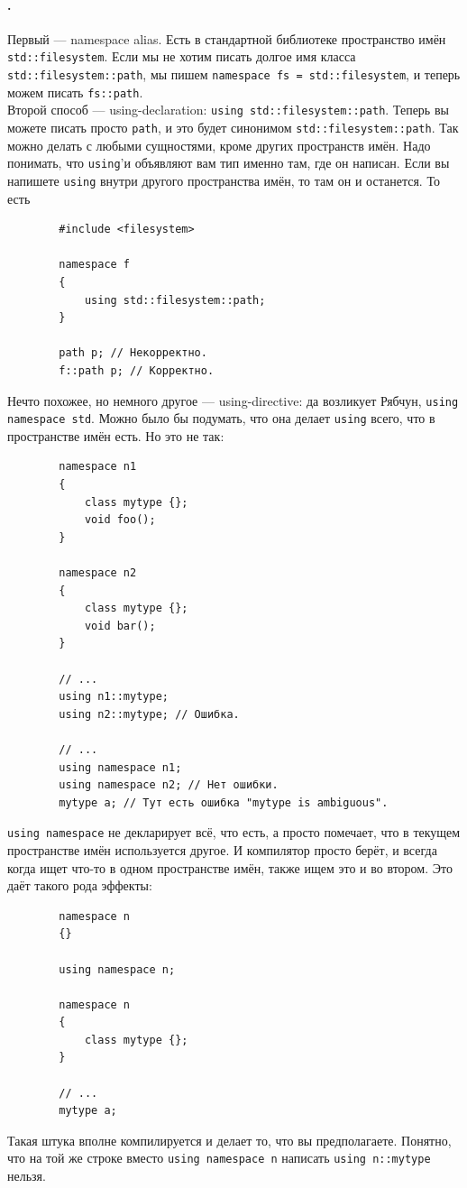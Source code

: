 \documentclass{article}
\begin{document}
    \paragraph{.}
    Первый --- namespace alias. Есть в стандартной библиотеке пространство имён \texttt{std::filesystem}. Если мы не хотим писать долгое имя класса\\\texttt{std::filesystem::path}, мы пишем \texttt{namespace fs = std::filesystem}, и теперь можем писать \texttt{fs::path}.\\
    Второй способ --- using-declaration: \texttt{using std::filesystem::path}. Теперь вы можете писать просто \texttt{path}, и это будет синонимом \texttt{std::filesystem::path}. Так можно делать с любыми сущностями, кроме других пространств имён. Надо понимать, что \texttt{using}'и объявляют вам тип именно там, где он написан. Если вы напишете \texttt{using} внутри другого пространства имён, то там он и останется. То есть
    \begin{verbatim}
        #include <filesystem>

        namespace f
        {
            using std::filesystem::path;
        }

        path p; // Некорректно.
        f::path p; // Корректно.
    \end{verbatim}
    Нечто похожее, но немного другое --- using-directive: да возликует Рябчун, \texttt{using namespace std}. Можно было бы подумать, что она делает \texttt{using} всего, что в пространстве имён есть. Но это не так:
    \begin{verbatim}
        namespace n1
        {
            class mytype {};
            void foo();
        }

        namespace n2
        {
            class mytype {};
            void bar();
        }

        // ...
        using n1::mytype;
        using n2::mytype; // Ошибка.

        // ...
        using namespace n1;
        using namespace n2; // Нет ошибки.
        mytype a; // Тут есть ошибка "mytype is ambiguous".
    \end{verbatim}
    \texttt{using namespace} не декларирует всё, что есть, а просто помечает, что в текущем пространстве имён используется другое. И компилятор просто берёт, и всегда когда ищет что-то в одном пространстве имён, также ищем это и во втором. Это даёт такого рода эффекты:
    \begin{verbatim}
        namespace n
        {}

        using namespace n;

        namespace n
        {
            class mytype {};
        }

        // ...
        mytype a;
    \end{verbatim}
    Такая штука вполне компилируется и делает то, что вы предполагаете. Понятно, что на той же строке вместо \texttt{using namespace n} написать \texttt{using n::mytype} нельзя.
\end{document}
